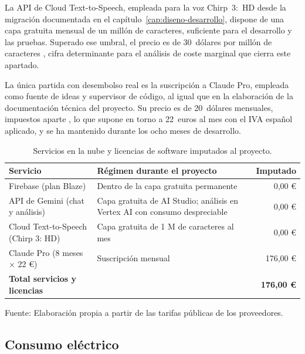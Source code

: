 La API de Cloud Text-to-Speech, empleada para la voz Chirp~3:~HD desde la migración documentada en
el capítulo~\ref{cap:diseno-desarrollo}, dispone de una capa gratuita mensual de un millón de caracteres,
suficiente para el desarrollo y las pruebas. Superado ese umbral, el precio es de 30~dólares por millón de
caracteres \citep{TTSPricing}, cifra determinante para el análisis de coste marginal que cierra este
apartado.

La única partida con desembolso real es la suscripción a Claude Pro, empleada como fuente de ideas y supervisor de
código, al igual que en la elaboración de la documentación técnica del proyecto. Su
precio es de 20~dólares mensuales, impuestos aparte \citep{ClaudePricing}, lo que supone en torno a
22~euros al mes con el IVA español aplicado, y se ha mantenido durante los ocho meses de desarrollo.

\begin{table}[htbp]
    \centering
    \caption{Servicios en la nube y licencias de software imputados al proyecto.}
    \label{tab:coste-servicios}
    \begin{tabularx}{\textwidth}{@{}>{\RaggedRight\arraybackslash}X >{\RaggedRight\arraybackslash}X r@{}}
        \toprule
        \textbf{Servicio} & \textbf{Régimen durante el proyecto} & \textbf{Imputado} \\
        \midrule
        Firebase (plan Blaze)          & Dentro de la capa gratuita permanente & 0,00 € \\
        API de Gemini (chat y análisis) & Capa gratuita de AI Studio; análisis en Vertex AI con consumo despreciable & 0,00 € \\
        Cloud Text-to-Speech (Chirp 3: HD) & Capa gratuita de 1 M de caracteres al mes & 0,00 € \\
        Claude Pro (8 meses $\times$ 22 €) & Suscripción mensual               & 176,00 € \\
        \midrule
        \textbf{Total servicios y licencias} &                                 & \textbf{176,00 €} \\
        \bottomrule
    \end{tabularx}

    \vspace{2pt}
    {\footnotesize Fuente: Elaboración propia a partir de las tarifas públicas de los proveedores.}
\end{table}

\subsection{Consumo eléctrico}

